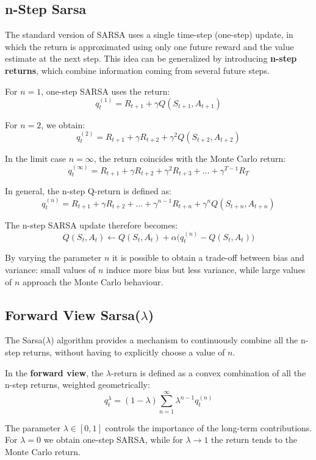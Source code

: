 \subsection{n-Step Sarsa}

The standard version of SARSA uses a single time-step (one-step) update, in which the return is approximated using only one future reward and the value estimate at the next step. This idea can be generalized by introducing \textbf{n-step returns}, which combine information coming from several future steps.

For $n = 1$, one-step SARSA uses the return:
\[
q_t^{(1)} = R_{t+1} + \gamma Q(S_{t+1}, A_{t+1})
\]

For $n = 2$, we obtain:
\[
q_t^{(2)} = R_{t+1} + \gamma R_{t+2} + \gamma^2 Q(S_{t+2}, A_{t+2})
\]

In the limit case $n = \infty$, the return coincides with the Monte Carlo return:
\[
q_t^{(\infty)} = R_{t+1} + \gamma R_{t+2} + \gamma^2 R_{t+3} + \dots + \gamma^{T-1} R_T
\]

In general, the n-step Q-return is defined as:
\[
q_t^{(n)} =
R_{t+1}
+ \gamma R_{t+2}
+ \dots
+ \gamma^{n-1} R_{t+n}
+ \gamma^n Q(S_{t+n}, A_{t+n})
\]

The n-step SARSA update therefore becomes:
\[
Q(S_t, A_t) \leftarrow Q(S_t, A_t)
+ \alpha \bigl( q_t^{(n)} - Q(S_t, A_t) \bigr)
\]

By varying the parameter $n$ it is possible to obtain a trade-off between bias and variance: small values of $n$ induce more bias but less variance, while large values of $n$ approach the Monte Carlo behaviour.


\subsection{Forward View Sarsa($\lambda$)}

The Sarsa($\lambda$) algorithm provides a mechanism to continuously combine all the n-step returns, without having to explicitly choose a value of $n$.

In the \textbf{forward view}, the $\lambda$-return is defined as a convex combination of all the n-step returns, weighted geometrically:
\[
q_t^{\lambda}
=
(1 - \lambda)
\sum_{n=1}^{\infty}
\lambda^{n-1}
q_t^{(n)}
\]

The parameter $\lambda \in [0,1]$ controls the importance of the long-term contributions. For $\lambda = 0$ we obtain one-step SARSA, while for $\lambda \to 1$ the return tends to the Monte Carlo return.

